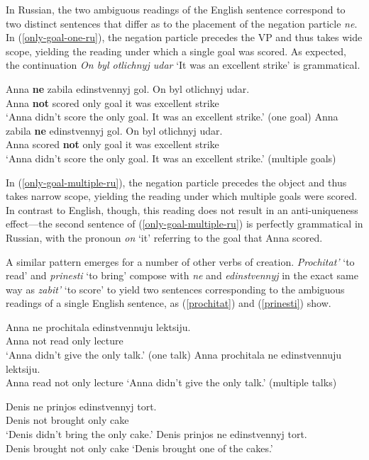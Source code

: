 \documentclass{article}
\begin{document}
In Russian, the two ambiguous readings of the English sentence correspond to two distinct sentences that differ as to the placement of the negation particle \textit{ne}. In (\ref{only-goal-one-ru}), the negation particle precedes the VP and thus takes wide scope, yielding the reading under which a single goal was scored. As expected, the continuation \textit{On byl otlichnyj udar} `It was an excellent strike' is grammatical.

\begin{exe}
	\ex \label{only-goal-one-ru} \gll Anna \textbf{ne} zabila edinstvennyj gol. On byl otlichnyj udar.\\
	Anna \textbf{not} scored only goal it was excellent strike\\
	\glt `Anna didn't score the only goal. It was an excellent strike.' (one goal)
	\ex \label{only-goal-multiple-ru} \gll Anna zabila \textbf{ne} edinstvennyj gol. On byl otlichnyj udar.\\
	Anna scored \textbf{not} only goal it was excellent strike\\
	\glt `Anna didn't score the only goal. It was an excellent strike.' (multiple goals)
\end{exe}

In (\ref{only-goal-multiple-ru}), the negation particle precedes the object and thus takes narrow scope, yielding the reading under which multiple goals were scored. In contrast to English, though, this reading does not result in an anti-uniqueness effect---the second sentence of (\ref{only-goal-multiple-ru}) is perfectly grammatical in Russian, with the pronoun \textit{on} `it' referring to the goal that Anna scored.


A similar pattern emerges for a number of other verbs of creation. \textit{Prochitat'} `to read' and \textit{prinesti} `to bring' compose with \textit{ne} and \textit{edinstvennyj} in the exact same way as \textit{zabit'} `to score' to yield two sentences corresponding to the ambiguous readings of a single English sentence, as (\ref{prochitat}) and (\ref{prinesti}) show.

\begin{exe}
	\ex \label{prochitat} \begin{xlist}
		\ex \gll Anna ne prochitala edinstvennuju lektsiju.\\
		Anna not read only lecture\\
		\glt `Anna didn't give the only talk.' (one talk)
		\ex Anna prochitala ne edinstvennuju lektsiju.\\
		Anna read not only lecture
		\glt `Anna didn't give the only talk.' (multiple talks)
	\end{xlist}
	\ex \label{prinesti} \begin{xlist}
		\ex \gll Denis ne prinjos edinstvennyj tort.\\
		Denis not brought only cake\\
		\glt `Denis didn't bring the only cake.'
		\ex Denis prinjos ne edinstvennyj tort.\\
		Denis brought not only cake
		\glt `Denis brought one of the cakes.'
	\end{xlist}
\end{exe}
\end{document}
